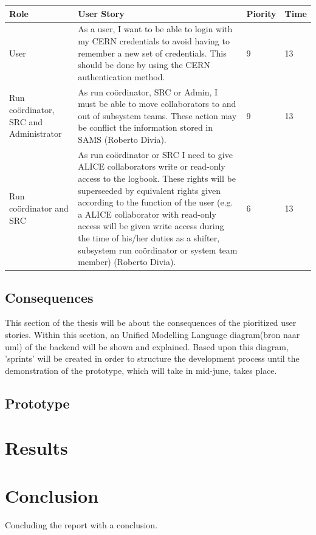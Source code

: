 \documentclass[paper=a4, fontsize=11pt,twoside]{scrartcl}	%
\begin{document}
\begin{longtable}{ | p{2cm} | p{8cm} | p{1.5cm} | l |}
\hline
Role & User Story & Piority & Time \\ \hline
User & As a user, I want to be able to login with my CERN credentials to avoid having to remember a new set of credentials. This should be done by using the CERN authentication method. & 9 & 13 \\ \hline
Run coördinator, SRC and Administrator &  As run coördinator, SRC or Admin, I must be able to move collaborators to and out of subsystem teams. These action may be conflict the information stored in SAMS (Roberto Divia). & 9 & 13 \\ \hline
Run coördinator and SRC &  As run coördinator or SRC I need to give ALICE collaborators write or read-only access to the logbook. These rights will be superseeded by equivalent rights given according to the function of the user (e.g. a ALICE collaborator with read-only access will be given write access during the time of his/her duties as a shifter, subsystem run coördinator or system team member) (Roberto Divia).&6&13 \\ \hline

\end{longtable}




\subsection{Consequences}
This section of the thesis will be about the consequences of the pioritized user stories. Within this section, an Unified Modelling Language diagram(bron naar uml) of the backend will be shown and explained. Based upon this diagram, 'sprints' will be created in order to structure the development process until the demonstration of the prototype, which will take in mid-june, takes place. \\


\subsection{Prototype}

\newpage
\section{Results}


\newpage
\section{Conclusion}
Concluding the report with a conclusion.
\newpage
\end{document}
